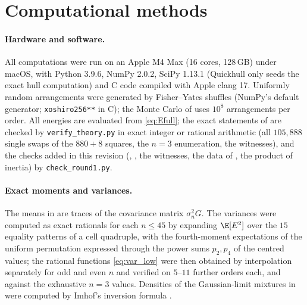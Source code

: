 \section{Computational methods}
\label{sec:appendix}

\paragraph{Hardware and software.}
All computations were run on an Apple M4 Max (16 cores, 128\,GB) under macOS, with Python 3.9.6, NumPy 2.0.2, SciPy 1.13.1 (Quickhull only seeds the exact hull computation) and C code compiled with Apple clang 17.
Uniformly random arrangements were generated by Fisher--Yates shuffles (NumPy's default generator; \texttt{xoshiro256**} in C); the Monte Carlo of  uses $10^8$ arrangements per order.
All energies are evaluated from \eqref{eq:Efull}; the exact statements of  are checked by \texttt{verify\_theory.py} in exact integer or rational arithmetic (all $105{,}888$ single swaps of the $880+8$ squares, the $n=3$ enumeration, the witnesses), and the checks added in this revision (, , the witnesses, the data of , the product of inertia) by \texttt{check\_round1.py}.

\paragraph{Exact moments and variances.}
The means in  are traces of the covariance matrix $\sigma_n^2G$.
The variances were computed as exact rationals for each $n\le45$ by expanding $\E[E^2]$ over the $15$ equality patterns of a cell quadruple, with the fourth-moment expectations of the uniform permutation expressed through the power sums $p_2,p_4$ of the centred values; the rational functions \eqref{eq:var_low} were then obtained by interpolation separately for odd and even $n$ and verified on $5$--$11$ further orders each, and against the exhaustive $n=3$ values.
Densities of the Gaussian-limit mixtures in  were computed by Imhof's inversion formula \cite{imhof1961}.

